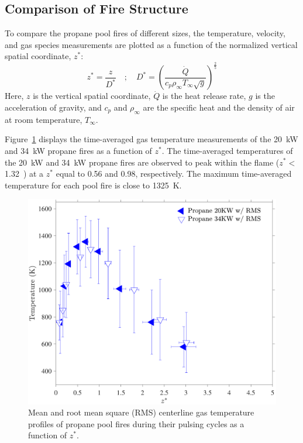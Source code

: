 \documentclass[12pt]{ussci}
\begin{document}
\subsection{Comparison of Fire Structure}
To compare the propane pool fires of different sizes, the temperature, velocity, and gas species measurements are plotted as a function of the normalized vertical spatial coordinate, $z^*$:
\begin{equation}\label{eq:Z_Star}
z^*=\frac{z}{D^*}  \quad ; \quad  D^* = \left(\frac{\dot{Q}}{c_{p}\rho_\infty T_\infty \sqrt{g}}\right)^{\frac{2}{5}}
\end{equation}
Here, $z$ is the vertical spatial coordinate, $\dot{Q}$ is the heat release rate, $g$ is the acceleration of gravity, and $c_p$ and $\rho_\infty$ are the specific heat and the density of air at room temperature, $T_\infty$.

Figure~\ref{fig:Temp_Comparison} displays the time-averaged gas temperature measurements of the 20~kW and 34~kW propane fires as a function of $z^*$.  The time-averaged temperatures of the 20~kW and 34~kW propane fires are observed to peak within the flame ($z^* <$ 1.32~\cite{Baum1989}) at a $z^*$ equal to 0.56 and 0.98, respectively. The maximum time-averaged temperature for each pool fire is close to 1325~K. 
\begin{figure}[h!]
	\centering
\includegraphics[width=8 cm, keepaspectratio]{Temperature.pdf}
	\caption[Mean and RMS centerline gas temperature profiles]{Mean and root mean square (RMS) centerline gas temperature profiles of propane pool fires during their pulsing cycles as a function of $z^*$.}
	\label{fig:Temp_Comparison}
\end{figure}
\end{document}
